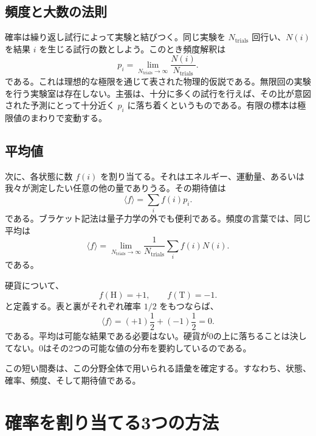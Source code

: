 \subsection{頻度と大数の法則}

確率は繰り返し試行によって実験と結びつく。同じ実験を \(N_{\mathrm{trials}}\) 回行い、\(N(i)\) を結果 \(i\) を生じる試行の数としよう。このとき頻度解釈は
\begin{equation}
 p_i=
 \lim_{N_{\mathrm{trials}}\to\infty}
 \frac{N(i)}{N_{\mathrm{trials}}}.
 \label{eq:sm1-frequency}
\end{equation}
である。これは理想的な極限を通じて表された物理的仮説である。無限回の実験を行う実験室は存在しない。主張は、十分に多くの試行を行えば、その比が意図された予測にとって十分近く \(p_i\) に落ち着くというものである。有限の標本は極限値のまわりで変動する。

\subsection{平均値}

次に、各状態に数 \(f(i)\) を割り当てる。それはエネルギー、運動量、あるいは我々が測定したい任意の他の量でありうる。その期待値は
\begin{equation}
 \langle f\rangle=\sum_i f(i)p_i.
 \label{eq:sm1-expectation}
\end{equation}
である。ブラケット記法は量子力学の外でも便利である。頻度の言葉では、同じ平均は
\begin{equation}
 \langle f\rangle
 =
 \lim_{N_{\mathrm{trials}}\to\infty}
 \frac{1}{N_{\mathrm{trials}}}
 \sum_i f(i)N(i).
 \label{eq:sm1-frequency-average}
\end{equation}
である。

硬貨について、
\begin{equation}
 f(\mathrm{H})=+1,
 \qquad
 f(\mathrm{T})=-1.
\end{equation}
と定義する。表と裏がそれぞれ確率 \(1/2\) をもつならば、
\begin{equation}
 \langle f\rangle
 =(+1)\frac12+(-1)\frac12=0.
\end{equation}
である。平均は可能な結果である必要はない。硬貨が0の上に落ちることは決してない。0はその2つの可能な値の分布を要約しているのである。

この短い間奏は、この分野全体で用いられる語彙を確定する。すなわち、状態、確率、頻度、そして期待値である。

\section{確率を割り当てる3つの方法}

